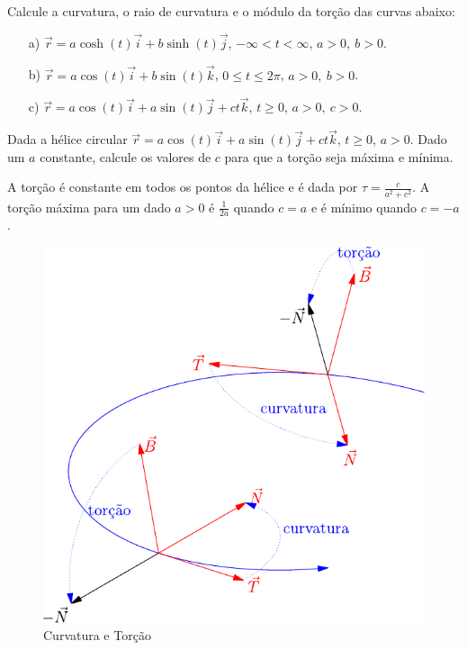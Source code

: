 \begin{exer} Calcule a curvatura, o raio de curvatura e o módulo da torção das curvas abaixo:
\begin{itemize}
\item[a)] $\vec{r}=a\cosh(t)\vec{i}+b\sinh(t)\vec{j}$, $-\infty<t<\infty$, $a>0,\ b>0$.
\item[b)] $\vec{r}=a\cos(t)\vec{i}+b\sin(t)\vec{k}$, $0\leq t\leq 2\pi$, $a>0,\ b>0$.
\item[c)] $\vec{r}=a\cos(t)\vec{i}+a\sin(t)\vec{j}+ct\vec{k}$, $t\geq 0$, $a>0,\ c>0$.

\end{itemize}
\end{exer}

 \begin{exer}{\label{prob_torcao}} Dada a hélice circular $\vec{r}=a\cos(t)\vec{i}+a\sin(t)\vec{j}+ct\vec{k}$, $t\geq 0$, $a>0$. Dado um $a$ constante, calcule os valores de $c$ para que a torção seja máxima e mínima.
 \end{exer}
\begin{resp}
  A torção é constante em todos os pontos da hélice e é dada por $\tau=\frac{c}{a^2+c^2}$. A torção máxima para um dado $a>0$ é $\frac{1}{2a}$ quando $c=a$ e é mínimo quando $c=-a$.
\end{resp}


 \begin{figure}
\begin{center}
    \includegraphics{./cap_curvas/figs/curvatura_torcao}
 \caption{Curvatura e Torção}\label{Curvatura_torcao_1}
  \end{center}
\end{figure}


